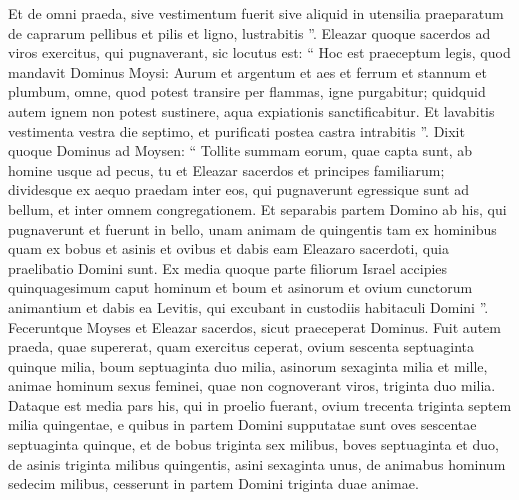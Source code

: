 \begin{biblechapter}
\begin{biblechapter}
\begin{biblechapter}
\begin{biblechapter}
\begin{biblechapter}
\begin{biblechapter}
\begin{biblechapter}
\begin{biblechapter}
\begin{biblechapter}
\begin{biblechapter}
\begin{biblechapter}
\begin{biblechapter}
\begin{biblechapter}
\begin{biblechapter}
\begin{biblechapter}
\begin{biblechapter}
\begin{biblechapter}
\begin{biblechapter}
\begin{biblechapter}
\begin{biblechapter}
\begin{biblechapter}
\begin{biblechapter}
\begin{biblechapter}
\begin{biblechapter}
\begin{biblechapter}
\begin{biblechapter}
\begin{biblechapter}
\begin{biblechapter}
\begin{biblechapter}
\begin{biblechapter}
\begin{biblechapter}
\verse Et de omni praeda, sive vestimentum fuerit sive aliquid in utensilia praeparatum de caprarum pellibus et pilis et ligno, lustrabitis ”.
 \verse Eleazar quoque sacerdos ad viros exercitus, qui pugnaverant, sic locutus est: “ Hoc est praeceptum legis, quod mandavit Dominus Moysi: 
\verse Aurum et argentum et aes et ferrum et stannum et plumbum, 
\verse omne, quod potest transire per flammas, igne purgabitur; quidquid autem ignem non potest sustinere, aqua expiationis sanctificabitur. 
\verse Et lavabitis vestimenta vestra die septimo, et purificati postea castra intrabitis ”.
 \verse Dixit quoque Dominus ad Moysen: 
\verse “ Tollite summam eorum, quae capta sunt, ab homine usque ad pecus, tu et Eleazar sacerdos et principes familiarum; 
 \verse dividesque ex aequo praedam inter eos, qui pugnaverunt egressique sunt ad bellum, et inter omnem congregationem. 
\verse Et separabis partem Domino ab his, qui pugnaverunt et fuerunt in bello, unam animam de quingentis tam ex hominibus quam ex bobus et asinis et ovibus 
\verse et dabis eam Eleazaro sacerdoti, quia praelibatio Domini sunt. 
\verse Ex media quoque parte filiorum Israel accipies quinquagesimum caput hominum et boum et asinorum et ovium cunctorum animantium et dabis ea Levitis, qui excubant in custodiis habitaculi Domini ”.
 \verse Feceruntque Moyses et Eleazar sacerdos, sicut praeceperat Dominus. 
\verse Fuit autem praeda, quae supererat, quam exercitus ceperat, ovium sescenta septuaginta quinque milia, 
\verse boum septuaginta duo milia, 
\verse asinorum sexaginta milia et mille, 
\verse animae hominum sexus feminei, quae non cognoverant viros, triginta duo milia. 
\verse Dataque est media pars his, qui in proelio fuerant, ovium trecenta triginta septem milia quingentae, 
\verse e quibus in partem Domini supputatae sunt oves sescentae septuaginta quinque, 
 \verse et de bobus triginta sex milibus, boves septuaginta et duo, 
\verse de asinis triginta milibus quingentis, asini sexaginta unus, 
\verse de animabus hominum sedecim milibus, cesserunt in partem Domini triginta duae animae. 

\end{biblechapter}
\end{biblechapter}
\end{biblechapter}
\end{biblechapter}
\end{biblechapter}
\end{biblechapter}
\end{biblechapter}
\end{biblechapter}
\end{biblechapter}
\end{biblechapter}
\end{biblechapter}
\end{biblechapter}
\end{biblechapter}
\end{biblechapter}
\end{biblechapter}
\end{biblechapter}
\end{biblechapter}
\end{biblechapter}
\end{biblechapter}
\end{biblechapter}
\end{biblechapter}
\end{biblechapter}
\end{biblechapter}
\end{biblechapter}
\end{biblechapter}
\end{biblechapter}
\end{biblechapter}
\end{biblechapter}
\end{biblechapter}
\end{biblechapter}
\end{biblechapter}
